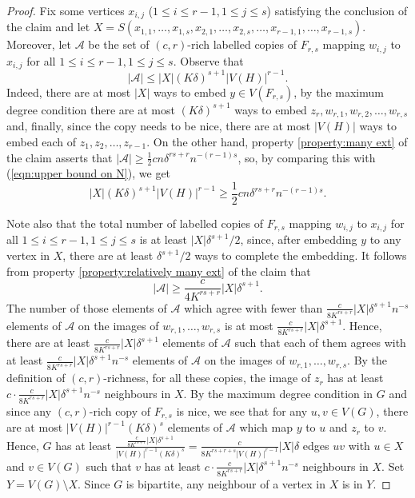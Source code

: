 \documentclass[11pt]{article}
\numberwithin{equation}{section}
\theoremstyle{definition}
\begin{document}
\begin{proof}
	Fix some vertices $x_{i,j}$ ($1\leq i\leq r-1,1\leq j\leq s$) satisfying the conclusion of the claim and let $X=S(x_{1,1},\dots,x_{1,s},x_{2,1},\dots,x_{2,s},\dots,x_{r-1,1},\dots,x_{r-1,s})$. Moreover, let $\mathcal{A}$ be the set of $(c,r)$-rich labelled copies of $F_{r,s}$ mapping $w_{i,j}$ to $x_{i,j}$ for all $1\leq i\leq r-1,1\leq j\leq s$.
	Observe that
	\begin{equation}
	    |\mathcal{A}|\leq |X|(K\delta)^{s+1}|V(H)|^{r-1}. \label{eqn:upper bound on N}
	\end{equation}
	Indeed, there are at most $|X|$ ways to embed $y\in V(F_{r,s})$, by the maximum degree condition there are at most $(K\delta)^{s+1}$ ways to embed $z_r,w_{r,1},w_{r,2},\dots,w_{r,s}$ and, finally, since the copy needs to be nice, there are at most $|V(H)|$ ways to embed each of $z_1,z_2,\dots,z_{r-1}$. On the other hand, property \ref{property:many ext} of the claim asserts that $|\mathcal{A}|\geq \frac{1}{2}cn\delta^{rs+r}n^{-(r-1)s}$, so, by comparing this with (\ref{eqn:upper bound on N}), we get
	\begin{equation}
	    |X|(K\delta)^{s+1}|V(H)|^{r-1}\geq \frac{1}{2}cn\delta^{rs+r}n^{-(r-1)s}. \label{eqn:lower bound on |X|}
	\end{equation}
	
	Note also that the total number of labelled copies of $F_{r,s}$ mapping $w_{i,j}$ to $x_{i,j}$ for all $1\leq i\leq r-1,1\leq j\leq s$ is at least $|X|\delta^{s+1}/2$, since, after embedding $y$ to any vertex in $X$, there are at least $\delta^{s+1}/2$ ways to complete the embedding. It follows from property \ref{property:relatively many ext} of the claim that
	\begin{equation*}
	    |\mathcal{A}|\geq \frac{c}{4K^{rs+r}}|X|\delta^{s+1}.
	\end{equation*}
	The number of those elements of $\mathcal{A}$ which agree with fewer than $\frac{c}{8K^{rs+r}}|X|\delta^{s+1}n^{-s}$ elements of $\mathcal{A}$ on the images of $w_{r,1},\dots,w_{r,s}$ is at most $\frac{c}{8K^{rs+r}}|X|\delta^{s+1}$. Hence, there are at least $\frac{c}{8K^{rs+r}}|X|\delta^{s+1}$ elements of $\mathcal{A}$ such that each of them agrees with at least $\frac{c}{8K^{rs+r}}|X|\delta^{s+1}n^{-s}$ elements of $\mathcal{A}$ on the images of $w_{r,1},\dots,w_{r,s}$. By the definition of $(c,r)$-richness, for all these copies, the image of $z_r$ has at least $c\cdot \frac{c}{8K^{rs+r}}|X|\delta^{s+1}n^{-s}$ neighbours in $X$. By the maximum degree condition in $G$ and since any $(c,r)$-rich copy of $F_{r,s}$ is nice, we see that for any $u,v\in V(G)$, there are at most $|V(H)|^{r-1}(K\delta)^s$ elements of $\mathcal{A}$ which map $y$ to $u$ and $z_r$ to $v$.
Hence, $G$ has at least $\frac{\frac{c}{8K^{rs+r}}|X|\delta^{s+1}}{|V(H)|^{r-1}(K\delta)^s}=\frac{c}{8K^{rs+r+s}|V(H)|^{r-1}}|X|\delta$ edges $uv$ with $u\in X$ and $v\in V(G)$ such that $v$ has at least $c\cdot \frac{c}{8K^{rs+r}}|X|\delta^{s+1}n^{-s}$ neighbours in $X$. Set $Y=V(G)\setminus X$. Since $G$ is bipartite, any neighbour of a vertex in $X$ is in $Y$.
	

\end{proof}
\end{document}
